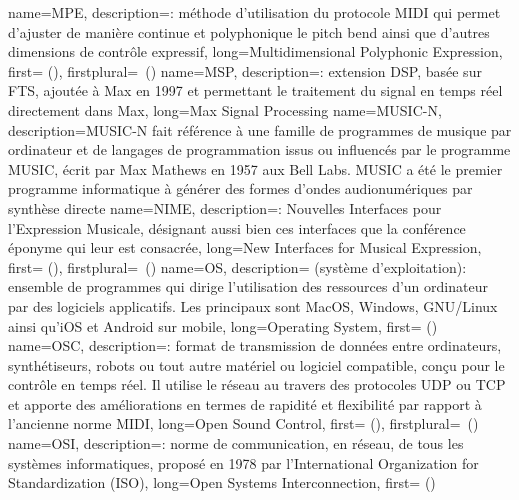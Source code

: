 {
    name={MPE},
    description={\textit{}: méthode d'utilisation du protocole MIDI qui permet d'ajuster de manière continue et polyphonique le pitch bend ainsi que d'autres dimensions de contrôle expressif},
    long={Multidimensional Polyphonic Expression},
   	first={ ()},
    firstplural={\glspluralsuffix\ (\glspluralsuffix)}
}
{
    name={MSP},
    description={\textit{}: extension \gls{DSP}, basée sur \gls{FTS}, ajoutée à Max en 1997 et permettant le traitement du signal en temps réel directement dans Max},
    long={Max Signal Processing}
}
{
    name={MUSIC-N},
    description={MUSIC-N fait référence à une famille de programmes de musique par ordinateur et de langages de programmation issus ou influencés par le programme MUSIC, écrit par Max Mathews en 1957 aux Bell Labs. MUSIC a été le premier programme informatique à générer des formes d'ondes audionumériques par synthèse directe}
}
{
    name={NIME},
    description={\textit{}: Nouvelles Interfaces pour l'Expression Musicale, désignant aussi bien ces interfaces que la conférence éponyme qui leur est consacrée},
    long={New Interfaces for Musical Expression},
    first={ ()},
    firstplural={\glspluralsuffix\ (\glspluralsuffix)}
}
{
    name={OS},
    description={\textit{} (système d'exploitation): ensemble de programmes qui dirige l'utilisation des ressources d'un ordinateur par des logiciels applicatifs. Les principaux sont MacOS, Windows, GNU/Linux ainsi qu'iOS et Android sur mobile},
    long={Operating System},
    first={ ()}
}
{
    name={OSC},
    description={\textit{}: format de transmission de données entre ordinateurs, synthétiseurs, robots ou tout autre matériel ou logiciel compatible, conçu pour le contrôle en temps réel. Il utilise le réseau au travers des protocoles \gls{UDP} ou \gls{TCP} et apporte des améliorations en termes de rapidité et flexibilité par rapport à l'ancienne norme MIDI},
    long={Open Sound Control},
    first={ ()},
    firstplural={\glspluralsuffix\ (\glspluralsuffix)}
}
{
    name={OSI},
    description={\textit{}: norme de communication, en réseau, de tous les systèmes informatiques, proposé en 1978 par l'International Organization for Standardization (ISO)},
    long={Open Systems Interconnection},
    first={ ()}
}
